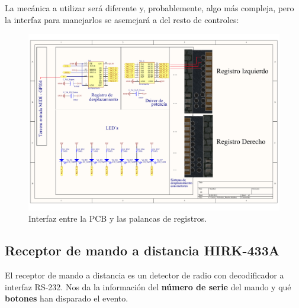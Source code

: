 La mecánica a utilizar será diferente y, probablemente, algo más compleja, pero la interfaz para manejarlos se asemejará a del resto de controles:

\smallskip

\begin{figure}[H]
	\noindent \begin{centering}
		\includegraphics[width=\linewidth*2/3]{capitulo3/pcb_registros}
		\par\end{centering}
	\smallskip
	\caption{\label{fig:pcb_registros} Interfaz entre la PCB y las palancas de registros.}
\end{figure} 

\smallskip

\subsection{Receptor de mando a distancia HIRK-433A}
\label{analisis_mando}

El receptor de mando a distancia es un detector de radio con decodificador a interfaz RS-232. Nos da la información del \textbf{número de serie} del mando y qué \textbf{botones} han disparado el evento. 

\smallskip

